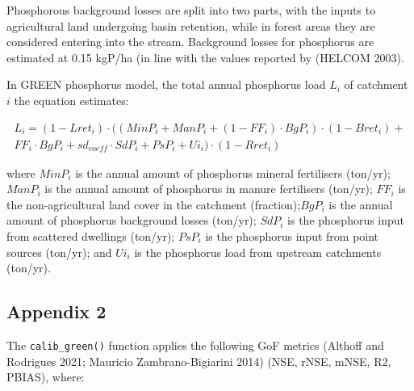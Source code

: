 Phosphorous background losses are split into two parts, with the inputs to agricultural land undergoing basin retention, while in forest areas they are considered entering into the stream. Background losses for phosphorus are estimated at 0.15 kgP/ha (in line with the values reported by (HELCOM 2003).

In GREEN phosphorus model, the total annual phosphorus load \(L_i\) of catchment \(i\) the equation estimates:

\begin{equation}
\begin{split}
  L_i = (1 - Lret_i) \cdot ((MinP_i + ManP_i + (1 - FF_i) \cdot BgP_i) \cdot (1 - Bret_i) + \\ 
  FF_i \cdot BgP_i + sd_{coeff} \cdot SdP_i + PsP_i + Ui_i) \cdot (1 - Rret_i) 
  \end{split}
\label{eq:appendix1-2}
\end{equation}

\noindent where \(MinP_i\) is the annual amount of phosphorus mineral fertilisers (ton/yr); \(ManP_i\) is the annual amount of phosphorus in manure fertilisers (ton/yr); \(FF_i\) is the non-agricultural land cover in the catchment (fraction);\(BgP_i\) is the annual amount of phosphorus background losses (ton/yr); \(SdP_i\) is the phosphorus input from scattered dwellings (ton/yr); \(PsP_i\) is the phosphorus input from point sources (ton/yr); and \(Ui_i\) is the phosphorus load from upstream catchments (ton/yr).

\hypertarget{appendix-2}{%
\subsection{Appendix 2}\label{appendix-2}}

The \texttt{calib\_green()} function applies the following GoF metrics (Althoff and Rodrigues 2021; Mauricio Zambrano-Bigiarini 2014) (NSE, rNSE, mNSE, R2, PBIAS), where:

